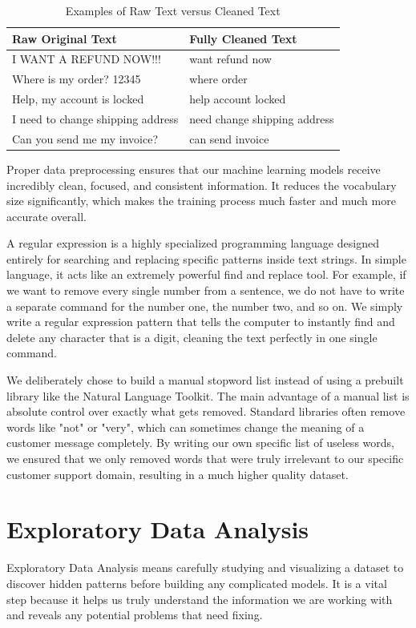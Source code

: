 \documentclass[12pt]{article}
\begin{document}
\begin{table}[H]
\centering
\caption{Examples of Raw Text versus Cleaned Text}
\begin{tabular}{|l|l|}
\hline
\textbf{Raw Original Text} & \textbf{Fully Cleaned Text} \\ \hline
I WANT A REFUND NOW!!! & want refund now \\ \hline
Where is my order? 12345 & where order \\ \hline
Help, my account is locked & help account locked \\ \hline
I need to change shipping address & need change shipping address \\ \hline
Can you send me my invoice? & can send invoice \\ \hline
\end{tabular}
\end{table}

Proper data preprocessing ensures that our machine learning models receive incredibly clean, focused, and consistent information. It reduces the vocabulary size significantly, which makes the training process much faster and much more accurate overall.


A regular expression is a highly specialized programming language designed entirely for searching and replacing specific patterns inside text strings. In simple language, it acts like an extremely powerful find and replace tool. For example, if we want to remove every single number from a sentence, we do not have to write a separate command for the number one, the number two, and so on. We simply write a regular expression pattern that tells the computer to instantly find and delete any character that is a digit, cleaning the text perfectly in one single command.

We deliberately chose to build a manual stopword list instead of using a prebuilt library like the Natural Language Toolkit. The main advantage of a manual list is absolute control over exactly what gets removed. Standard libraries often remove words like "not" or "very", which can sometimes change the meaning of a customer message completely. By writing our own specific list of useless words, we ensured that we only removed words that were truly irrelevant to our specific customer support domain, resulting in a much higher quality dataset.

\section{Exploratory Data Analysis}
Exploratory Data Analysis means carefully studying and visualizing a dataset to discover hidden patterns before building any complicated models. It is a vital step because it helps us truly understand the information we are working with and reveals any potential problems that need fixing. 
\end{document}
